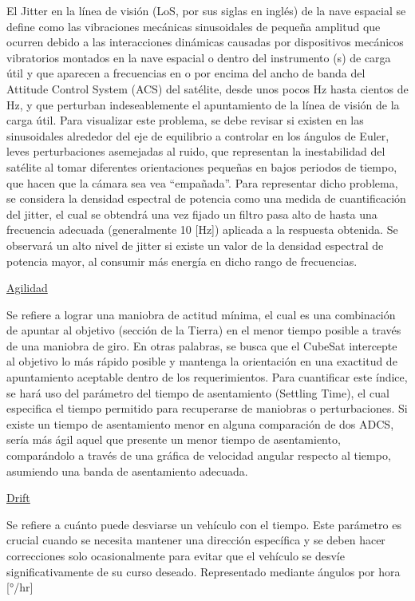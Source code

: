El Jitter en la línea de visión (LoS, por sus siglas en inglés) de la nave espacial se define como las vibraciones mecánicas sinusoidales de pequeña amplitud que ocurren debido a las interacciones dinámicas causadas por dispositivos mecánicos vibratorios montados en la nave espacial o dentro del instrumento (s) de carga útil y que aparecen a frecuencias en o por encima del ancho de banda del Attitude Control System (ACS) del satélite, desde unos pocos Hz hasta cientos de Hz, y que perturban indeseablemente el apuntamiento de la línea de visión de la carga útil. Para visualizar este problema, se debe revisar si existen en las sinusoidales alrededor del eje de equilibrio a controlar en los ángulos de Euler, leves perturbaciones asemejadas al ruido, que representan la inestabilidad del satélite al tomar diferentes orientaciones pequeñas en bajos periodos de tiempo, que hacen que la cámara sea vea “empañada”. Para representar dicho problema, se considera la densidad espectral de potencia como una medida de cuantificación del jitter, el cual se obtendrá una vez fijado un filtro pasa alto de hasta una frecuencia adecuada (generalmente 10 [Hz]) aplicada a la respuesta obtenida. Se observará un alto nivel de jitter si existe un valor de la densidad espectral de potencia mayor, al consumir más energía en dicho rango de frecuencias.

\underline{Agilidad \cite{ref5, ref11}}

Se refiere a lograr una maniobra de actitud mínima, el cual es una combinación de apuntar al objetivo (sección de la Tierra) en el menor tiempo posible a través de una maniobra de giro. En otras palabras, se busca que el CubeSat intercepte al objetivo lo más rápido posible y mantenga la orientación en una exactitud de apuntamiento aceptable dentro de los requerimientos. Para cuantificar este índice, se hará uso del parámetro del tiempo de asentamiento (Settling Time), el cual especifica el tiempo permitido para recuperarse de maniobras o perturbaciones. Si existe un tiempo de asentamiento menor en alguna comparación de dos ADCS, sería más ágil aquel que presente un menor tiempo de asentamiento, comparándolo a través de una gráfica de velocidad angular respecto al tiempo, asumiendo una banda de asentamiento adecuada.

\underline{Drift \cite{ref5}}

Se refiere a cuánto puede desviarse un vehículo con el tiempo. Este parámetro es crucial cuando se necesita mantener una dirección específica y se deben hacer correcciones solo ocasionalmente para evitar que el vehículo se desvíe significativamente de su curso deseado. Representado mediante ángulos por hora [°/hr]

